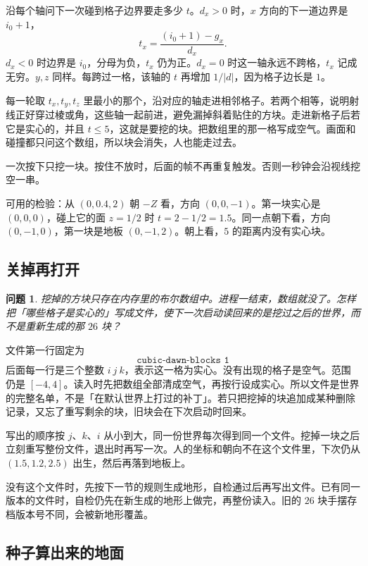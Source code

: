 \documentclass[12pt,a4paper]{article}
\theoremstyle{definition}
\theoremstyle{plain}
\newtheorem{problem}{问题}[section]
\theoremstyle{remark}
\begin{document}
沿每个轴问下一次碰到格子边界要走多少 \(t\)。\(d_x>0\) 时，\(x\) 方向的下一道边界是 \(i_0+1\)，
\[
t_x=\frac{(i_0+1)-g_x}{d_x}.
\]
\(d_x<0\) 时边界是 \(i_0\)，分母为负，\(t_x\) 仍为正。\(d_x=0\) 时这一轴永远不跨格，\(t_x\) 记成无穷。\(y,z\) 同样。每跨过一格，该轴的 \(t\) 再增加 \(1/|d|\)，因为格子边长是 \(1\)。

每一轮取 \(t_x,t_y,t_z\) 里最小的那个，沿对应的轴走进相邻格子。若两个相等，说明射线正好穿过棱或角，这些轴一起前进，避免漏掉斜着贴住的方块。走进新格子后若它是实心的，并且 \(t\le 5\)，这就是要挖的块。把数组里的那一格写成空气。画面和碰撞都只问这个数组，所以块会消失，人也能走过去。

一次按下只挖一块。按住不放时，后面的帧不再重复触发。否则一秒钟会沿视线挖空一串。

可用的检验：从 \((0,0.4,2)\) 朝 \(-Z\) 看，方向 \((0,0,-1)\)。第一块实心是 \((0,0,0)\)，碰上它的面 \(z=1/2\) 时 \(t=2-1/2=1.5\)。同一点朝下看，方向 \((0,-1,0)\)，第一块是地板 \((0,-1,2)\)。朝上看，\(5\) 的距离内没有实心块。

\subsection{关掉再打开}

\begin{problem}
挖掉的方块只存在内存里的布尔数组中。进程一结束，数组就没了。怎样把「哪些格子是实心的」写成文件，使下一次启动读回来的是挖过之后的世界，而不是重新生成的那 \(26\) 块？
\end{problem}

文件第一行固定为
\[
\texttt{cubic-dawn-blocks 1}
\]
后面每一行是三个整数 \(i\ j\ k\)，表示这一格为实心。没有出现的格子是空气。范围仍是 \([-4,4]\)。读入时先把数组全部清成空气，再按行设成实心。所以文件是世界的完整名单，不是「在默认世界上打过的补丁」。若只把挖掉的块追加成某种删除记录，又忘了重写剩余的块，旧块会在下次启动时回来。

写出的顺序按 \(j\)、\(k\)、\(i\) 从小到大，同一份世界每次得到同一个文件。挖掉一块之后立刻重写整份文件，退出时再写一次。人的坐标和朝向不在这个文件里，下次仍从 \((1.5,1.2,2.5)\) 出生，然后再落到地板上。

没有这个文件时，先按下一节的规则生成地形，自检通过后再写出文件。已有同一版本的文件时，自检仍先在新生成的地形上做完，再整份读入。旧的 \(26\) 块手摆存档版本号不同，会被新地形覆盖。

\subsection{种子算出来的地面}
\end{document}
